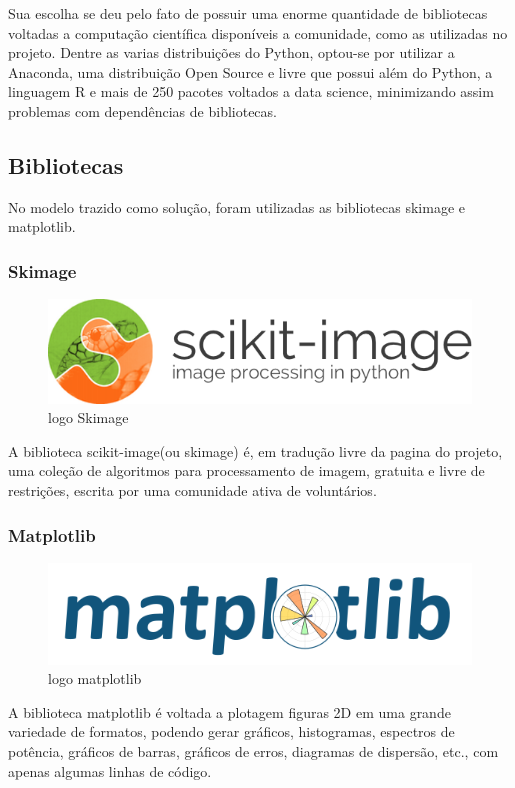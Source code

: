 \documentclass[journal]{IEEEtran}
\begin{document}
Sua escolha se deu pelo fato de possuir uma enorme quantidade de bibliotecas voltadas a computação científica disponíveis a comunidade, como as utilizadas no projeto.
Dentre as varias distribuições do Python, optou-se por utilizar a Anaconda, uma distribuição Open Source e livre que possui além do Python, a linguagem R e mais de 250 pacotes voltados a data science, minimizando assim problemas com dependências de bibliotecas. 
\subsection{Bibliotecas}
No modelo trazido como solução, foram utilizadas as bibliotecas skimage e matplotlib.

\subsubsection{Skimage}

\begin{figure}[!ht]
	\centering
	\includegraphics[scale=0.3]{logo}
	\caption{logo Skimage}
\end{figure}
A biblioteca scikit-image(ou skimage) é, em tradução livre da pagina do projeto, uma coleção de algoritmos para processamento de imagem, gratuita e livre de restrições, escrita por uma comunidade ativa de voluntários. 

\subsubsection{Matplotlib}

\begin{figure}[!ht]
	\centering
	\includegraphics[scale=0.3]{logo2}
	\caption{logo matplotlib}
\end{figure}

A biblioteca matplotlib é voltada a plotagem figuras 2D em uma grande variedade de formatos, podendo gerar gráficos, histogramas, espectros de potência, gráficos de barras, gráficos de erros, diagramas de dispersão, etc., com apenas algumas linhas de código.
\end{document}
